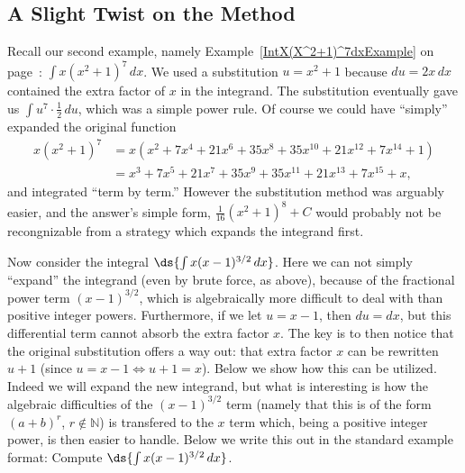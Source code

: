\subsection{A Slight Twist on the Method}

Recall our second example, namely Example~\ref{IntX(X^2+1)^7dxExample}
on page~\pageref{IntX(X^2+1)^7dxExample}: $\int x(x^2+1)^7\,dx$.
We used a substitution $u=x^2+1$ because $du=2x\,dx$ contained the
extra factor of $x$ in the integrand.  The substitution
eventually gave us $\int u^7\cdot\frac12\,du$, which was a simple
power rule.  Of course we could have ``simply'' expanded the
original function
\begin{align*}
x(x^2+1)^7&=x(x^2+7x^4+21x^6+35x^8+35x^{10}+21x^{12}+7x^{14}+1)\\
          &=x^3+7x^5+21x^7+35x^9+35x^{11}+21x^{13}+7x^{15}+x,
\end{align*}
and integrated ``term by term.''  However the substitution method was
arguably easier, and the answer's simple form, 
$\frac1{16}(x^2+1)^{8}+C$ would
probably not be recongnizable from a strategy which expands the
integrand first.

Now consider the integral $\ds{\int x(x-1)^{3/2}\,dx}$.
Here we can not simply ``expand'' the integrand (even
by brute force, as above), because
of the fractional power term $(x-1)^{3/2}$, which is algebraically
more difficult to deal with than positive integer powers.  Furthermore,
if we let $u=x-1$, then $du=dx$, but this differential
term cannot absorb the extra factor $x$. The key is to then
notice that the original substitution offers a way out:
that extra factor $x$ can be rewritten $u+1$ (since
$u=x-1\iff u+1=x$).
Below we show how this can be utilized.
Indeed we will expand the new integrand, but what is interesting 
is how the algebraic difficulties of the $(x-1)^{3/2}$ term
(namely that this is of the form $({a+b})^{r}$,
$r\not\in\mathbb{N}$) is transfered
to the $x$ term which, being a positive integer power, is 
then easier to handle.  Below we write this out in the standard
example format:\newpage
\bex Compute $\ds{\int x(x-1)^{3/2}\,dx}$.

